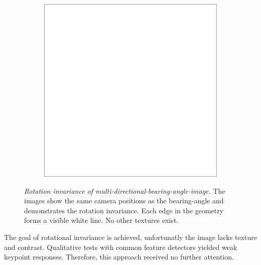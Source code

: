 \begin{figure}[H]
\begin{subfigure}[t]{0.32\textwidth}
    \end{subfigure}
    \begin{subfigure}[t]{0.32\textwidth}
        \includegraphics[width=\linewidth]{chapter04/img/max-0210.png}
    \end{subfigure}
    \caption[Rotation invariance of \gls{multi-directional-bearing-angle-image}]{\emph{Rotation invariance of \gls{multi-directional-bearing-angle-image}.} The images show the same camera positions as the \gls{bearing-angle} and demonstrates the rotation invariance. Each edge in the geometry forms a visible white line. No other textures exist.}\label{fig:max-curve-images}
\end{figure}
The goal of rotational invariance is achieved, unfortunatly the image lacks texture and contrast.
Qualitative tests with common feature detectors yielded weak keypoint responses.
Therefore, this approach received no further attention.
